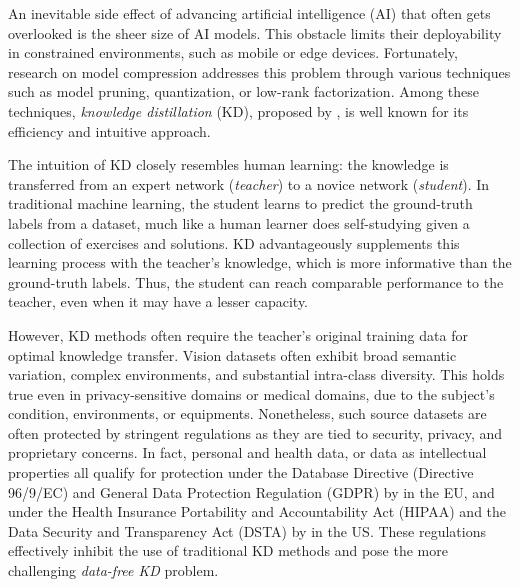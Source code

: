 \begin{foldable} %
    An inevitable side effect of advancing artificial intelligence (AI) that often gets overlooked is the sheer size of AI models.
    This obstacle limits their deployability in constrained environments, such as mobile or edge devices.
    Fortunately, research on model compression addresses this problem through various techniques such as model pruning, quantization, or low-rank factorization.
    Among these techniques, \textit{knowledge distillation} (KD), proposed by \citet{hinton2015distilling}, is well known for its efficiency and intuitive approach.
\end{foldable}

\begin{foldable} %
    The intuition of KD closely resembles human learning: the knowledge is transferred from an expert network (\textit{teacher}) to a novice network (\textit{student}).
    In traditional machine learning, the student learns to predict the ground-truth labels from a dataset, much like a human learner does self-studying given a collection of exercises and solutions.
    KD advantageously supplements this learning process with the teacher's knowledge, which is more informative than the ground-truth labels.
    Thus, the student can reach comparable performance to the teacher, even when it may have a lesser capacity.
\end{foldable}

\begin{foldable} %
    However, KD methods often require the teacher's original training data for optimal knowledge transfer.
    Vision datasets often exhibit broad semantic variation, complex environments, and substantial intra-class diversity.
    This holds true even in privacy-sensitive domains or medical domains, due to the subject's condition, environments, or equipments.
    Nonetheless, such source datasets are often protected by stringent regulations as they are tied to security, privacy, and proprietary concerns.
    In fact, personal and health data, or data as intellectual properties all qualify for protection under the Database Directive (Directive 96/9/EC) and General Data Protection Regulation (GDPR) by \citet{eu1996databasedirective, eu2016gdpr} in the EU, and under the Health Insurance Portability and Accountability Act (HIPAA) and the Data Security and Transparency Act (DSTA) by \citet{us1996hipaa, us2016dsta} in the US.
    These regulations effectively inhibit the use of traditional KD methods and pose the more challenging \textit{data-free KD} problem.
\end{foldable}

